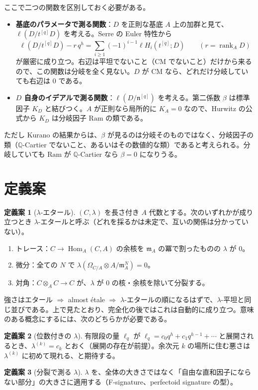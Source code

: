 \documentclass[11pt,a4paper]{ltjsarticle}
\theoremstyle{plain}
\theoremstyle{definition}
\newtheorem{definition}{定義案}
\theoremstyle{remark}
\theoremstyle{plain}
\newcommand{\m}{\mathfrak{m}}
\newcommand{\n}{\mathfrak{n}}
\newcommand{\Hom}{\operatorname{Hom}}
\newcommand{\rank}{\operatorname{rank}}
\begin{document}
ここで二つの関数を区別しておく必要がある。
\begin{itemize}
  \item \textbf{基底のパラメータで測る関数}：$D$ を正則な基底 $A$ 上の加群と見て、$\ell(D/t^{[q]}D)$ を考える。Serre の Euler 特性から
  \[
    \ell(D/t^{[q]}D) - r\,q^h = \sum_{i\ge1}(-1)^{i-1}\ell H_i(t^{[q]};D)\qquad(r = \rank_A D)
  \]
  が厳密に成り立つ。右辺は平坦でないこと（CM でないこと）だけから来るので、この関数は分岐を全く見ない。$D$ が CM なら、どれだけ分岐していても右辺は $0$ である。
  \item \textbf{$D$ 自身のイデアルで測る関数}：$\ell(D/\n^{[q]})$ を考える。第二係数 $\beta$ は標準因子 $K_D$ と結びつく。$A$ が正則なら局所的に $K_A = 0$ なので、Hurwitz の公式から $K_D$ は分岐因子 $\mathrm{Ram}$ の類である。
\end{itemize}
ただし Kurano の結果からは、$\beta$ が見るのは分岐そのものではなく、分岐因子の類（$\mathbb{Q}$-Cartier でないこと、あるいはその数値的な類）であると考えられる。分岐していても $\mathrm{Ram}$ が $\mathbb{Q}$-Cartier なら $\beta = 0$ になりうる。

\section{定義案}

\begin{definition}[$\lambda$-エタール]
$(C,\lambda)$ を長さ付き $A$ 代数とする。次のいずれかが成り立つとき $\lambda$-エタールと呼ぶ（どれを採るかは未定で、互いの関係は分かっていない）。
\begin{enumerate}
  \item トレース：$C\to\Hom_A(C,A)$ の余核を $\m_A$ の冪で割ったものの $\lambda$ が $0$。
  \item 微分：全ての $N$ で $\lambda(\Omega_{C/A}\otimes A/\m_A^N) = 0$。
  \item 対角：$C\otimes_A C\to C$ が、$\lambda$ が $0$ の核・余核を除いて分裂する。
\end{enumerate}
\end{definition}
強さはエタール $\Rightarrow$ almost étale $\Rightarrow$ $\lambda$-エタールの順になるはずで、$\lambda$-平坦と同じ並びである。上で見たとおり、完全化の後ではこれは自動的に成り立つ。意味のある概念にするには、次のどちらかが必要である。
\begin{definition}[位数付きの $\lambda$]
有限段の量 $\ell_q$ が $\ell_q = c_0 q^h + c_1 q^{h-1} + \cdots$ と展開されるとき、$\lambda^{(k)} = c_k$ とおく（展開の存在が前提）。余次元 $k$ の場所に住む悪さは $\lambda^{(k)}$ に初めて現れる、と期待する。
\end{definition}
\begin{definition}[分裂で測る $\lambda$]
$\lambda$ を、全体の大きさではなく「自由な直和因子にならない部分」の大きさに適用する（F-signature、perfectoid signature の型）。
\end{definition}
\end{document}
